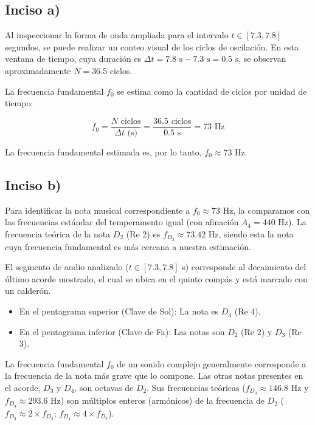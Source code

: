 \documentclass[paper=letter, fontsize=11pt, draft=false]{scrartcl}
\numberwithin{equation}{problemcounter} %
\numberwithin{figure}{problemcounter} %
\numberwithin{table}{problemcounter} %
\numberwithin{subsection}{problemcounter}
\begin{document}
\subsection{Inciso a)}

Al inspeccionar la forma de onda ampliada para el intervalo $t \in [7.3, 7.8]$ segundos, se puede realizar un conteo visual de los ciclos de oscilación. En esta ventana de tiempo, cuya duración es $\Delta t = 7.8 \text{ s} - 7.3 \text{ s} = 0.5 \text{ s}$, se observan aproximadamente $N = 36.5$ ciclos.

La frecuencia fundamental $f_0$ se estima como la cantidad de ciclos por unidad de tiempo:

\begin{equation}
    f_0 = \frac{N \text{ ciclos}}{\Delta t \text{ (s)}} = \frac{36.5 \text{ ciclos}}{0.5 \text{ s}} = 73 \text{ Hz}
\end{equation}

La frecuencia fundamental estimada es, por lo tanto, $f_0 \approx 73 \text{ Hz}$.

\subsection{Inciso b)}

Para identificar la nota musical correspondiente a $f_0 \approx 73 \text{ Hz}$, la comparamos con las frecuencias estándar del temperamento igual (con afinación $A_4 = 440 \text{ Hz}$). La frecuencia teórica de la nota $D_2$ (Re 2) es $f_{D_2} \approx 73.42 \text{ Hz}$, siendo esta la nota cuya frecuencia fundamental es más cercana a nuestra estimación.

El segmento de audio analizado ($t \in [7.3, 7.8]$ s) corresponde al decaimiento del último acorde mostrado, el cual se ubica en el quinto compás y está marcado con un calderón.

\begin{itemize}

\item En el pentagrama superior (Clave de Sol): La nota es $D_4$ (Re 4).

\item En el pentagrama inferior (Clave de Fa): Las notas son $D_2$ (Re 2) y $D_3$ (Re 3).

\end{itemize}

La frecuencia fundamental $f_0$ de un sonido complejo generalmente corresponde a la frecuencia de la nota más grave que lo compone. Las otras notas presentes en el acorde, $D_3$ y $D_4$, son octavas de $D_2$. Sus frecuencias teóricas ($f_{D_3} \approx 146.8 \text{ Hz}$ y $f_{D_4} \approx 293.6 \text{ Hz}$) son múltiplos enteros (armónicos) de la frecuencia de $D_2$ ($f_{D_3} \approx 2 \times f_{D_2}$; $f_{D_4} \approx 4 \times f_{D_2}$).
\end{document}
